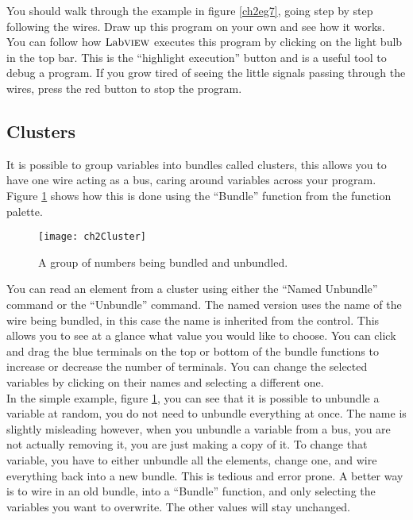 You should walk through the example in figure \ref{ch2eg7}, going step by step following the wires. Draw up this program on your own and see how it works. You can follow how $\text{Lab}\textsc{view}$ executes this program by clicking on the light bulb in the top bar. This is the ``highlight execution'' button and is a useful tool to debug a program. If you grow tired of seeing the little signals passing through the wires, press the red button to stop the program.\\

\subsection{Clusters}
It is possible to group variables into bundles called clusters, this allows you to have one wire acting as a bus, caring around variables across your program. Figure \ref{ch2Cluster} shows how this is done using the ``Bundle'' function from the function palette.\\
\begin{figure}
	\centering
	\texttt{[image: ch2Cluster]}
	\caption{A group of numbers being bundled and unbundled.}
	\label{ch2Cluster}
\end{figure}

You can read an element from a cluster using either the ``Named Unbundle'' command or the ``Unbundle'' command. The named version uses the name of the wire being bundled, in this case the name is inherited from the control. This allows you to see at a glance what value you would like to choose. You can click and drag the blue terminals on the top or bottom of the bundle functions to increase or decrease the number of terminals. You can change the selected variables by clicking on their names and selecting a different one.\\

In the simple example, figure \ref{ch2Cluster}, you can see that it is possible to unbundle a variable at random, you do not need to unbundle everything at once. The name is slightly misleading however, when you unbundle a variable from a bus, you are not actually removing it, you are just making a copy of it. To change that variable, you have to either unbundle all the elements, change one, and wire everything back into a new bundle. This is tedious and error prone. A better way is to wire in an old bundle, into a ``Bundle'' function, and only selecting the variables you want to overwrite. The other values will stay unchanged.\\

